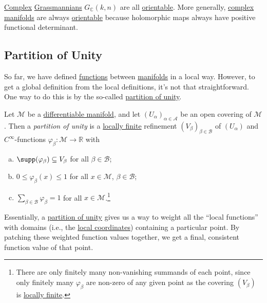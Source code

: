 \begin{remark}
	\hyperref[def:complex-manifold]{Complex} \hyperref[def:Grassmannian-manifold]{Grassmannians} \(G_{\mathbb{C} }(k, n)\) are all \hyperref[def:orientable]{orientable}. More generally, \hyperref[def:complex-manifold]{complex manifolds} are always \hyperref[def:orientable]{orientable} because holomorphic maps always have positive functional determinant.
\end{remark}

\subsection{Partition of Unity}
So far, we have defined \hyperref[def:smooth-function]{functions} between \hyperref[def:smooth-manifold]{manifolds} in a local way. However, to get a global definition from the local definitions, it's not that straightforward. One way to do this is by the so-called \hyperref[def:partition-of-unity]{partition of unity}.

\begin{definition}\label{def:partition-of-unity}
	Let \(\mathcal{M} \) be a \hyperref[def:smooth-manifold]{differentiable manifold}, and let \((U_\alpha )_{\alpha \in \mathcal{A} }\) be an open covering of \(\mathcal{M} \). Then a \emph{partition of unity} is a \hyperref[def:locally-finite]{locally finite} refinement \((V_\beta )_{\beta \in \mathcal{B} }\) of \((U_\alpha )\) and \(C^{\infty} \)-functions \(\varphi _\beta \colon \mathcal{M} \to \mathbb{R} \) with
	\begin{enumerate}[(a)]
		\item \(\supp(\varphi _\beta ) \subseteq V_\beta \) for all \(\beta \in \mathcal{B} \);
		\item \(0 \leq \varphi _\beta (x) \leq 1\) for all \(x\in \mathcal{M} \), \(\beta \in \mathcal{B} \);
		\item \(\sum_{\beta \in \mathcal{B} } \varphi _\beta = 1 \) for all \(x\in \mathcal{M} \).\footnote{There are only finitely many non-vanishing summands of each point, since only finitely many \(\varphi _\beta \) are non-zero of any given point as the covering \((V_\beta )\) is \hyperref[def:locally-finite]{locally finite}.}
	\end{enumerate}
\end{definition}

\begin{intuition}
	Essentially, a \hyperref[def:partition-of-unity]{partition of unity} gives us a way to weight all the ``local functions'' with domains (i.e., the \hyperref[def:local-coordinate]{local coordinates}) containing a particular point. By patching these weighted function values together, we get a final, consistent function value of that point.
\end{intuition}

